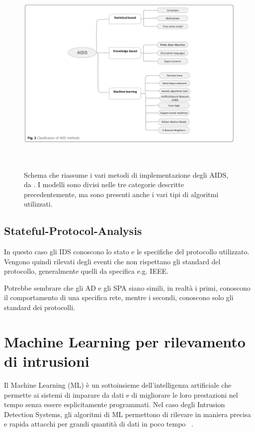 \begin{figure}[htpb]
    \centering
    \includegraphics[width=\textwidth,height=10cm,keepaspectratio=true]{img/aids_classification.png}
    \caption{
        Schema che riassume i vari metodi di implementazione degli AIDS, da \cite{SurveyIntrusionDetection2019}. I modelli sono divisi nelle tre categorie descritte precedentemente, ma sono presenti anche i vari tipi di algoritmi utilizzati.
    }
    \label{fig:aids_classification}
\end{figure}


\subsection{Stateful-Protocol-Analysis}

In questo caso gli IDS conoscono lo stato e le specifiche del protocollo utilizzato. Vengono quindi rilevati degli eventi che non rispettano gli standard del protocollo, generalmente quelli da specifica e.g. IEEE.

Potrebbe sembrare che gli AD e gli SPA siano simili, in realtà i primi, conoscono il comportamento di una specifica rete,  mentre i secondi, conoscono solo gli standard dei protocolli.



\section{Machine Learning per rilevamento di intrusioni}

Il Machine Learning (ML) è un sottoinsieme dell'intelligenza artificiale che permette ai sistemi di imparare da dati e di migliorare le loro prestazioni nel tempo senza essere esplicitamente programmati. Nel caso degli Intrusion Detection Systems, gli algoritmi di ML permettono di rilevare in maniera precisa e rapida attacchi per grandi quantità di dati in poco tempo ~\cite{saranyaPerformanceAnalysisMachine2020}.


